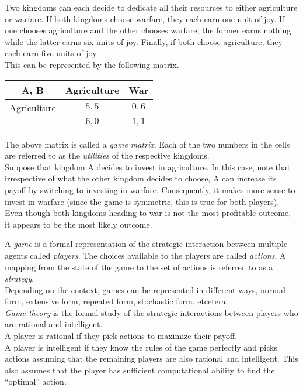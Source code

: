 \begin{fex}
	\label{ex: neighbouring kingdom dilemma}
	Two kingdoms can each decide to dedicate all their resources to either agriculture or warfare. If both kingdoms choose warfare, they each earn one unit of joy. If one chooses agriculture and the other chooses warfare, the former earns nothing while the latter earns six units of joy. Finally, if both choose agriculture, they each earn five units of joy.\\
	This can be represented by the following matrix.

	\begin{center}
	\begin{tabular}{|c||c|c|}
		\hline
		A, B & \textsf{Agriculture} & \textsf{War} \\
		\hline\hline
		\textsf{Agriculture} & $5, 5$ & $0, 6$ \\
		\hline
		\sf{War} & $6, 0$ & $1, 1$ \\
		\hline
	\end{tabular}
	\end{center}

	The above matrix is called a \emph{game matrix}. Each of the two numbers in the cells are referred to as the \emph{utilities} of the respective kingdoms.\\
	Suppose that kingdom A decides to invest in agriculture. In this case, note that irrespective of what the other kingdom decides to choose, A can increase its payoff by switching to investing in warfare. Consequently, it makes more sense to invest in warfare (since the game is symmetric, this is true for both players). Even though both kingdoms heading to war is not the most profitable outcome, it appears to be the most likely outcome.\\
\end{fex}

A \emph{game} is a formal representation of the strategic interaction between multiple agents called \emph{players}.
The choices available to the players are called \emph{actions}. A mapping from the state of the game to the set of actions is referred to as a \emph{strategy}.\\
Depending on the context, games can be represented in different ways, normal form, extensive form, repeated form, stochastic form, etcetera.\\

\emph{Game theory} is the formal study of the strategic interactions between players who are rational and intelligent.\\
A player is rational if they pick actions to maximize their payoff.\\
A player is intelligent if they know the rules of the game perfectly and picks actions assuming that the remaining players are also rational and intelligent. This also assumes that the player has sufficient computational ability to find the ``optimal'' action.\\


